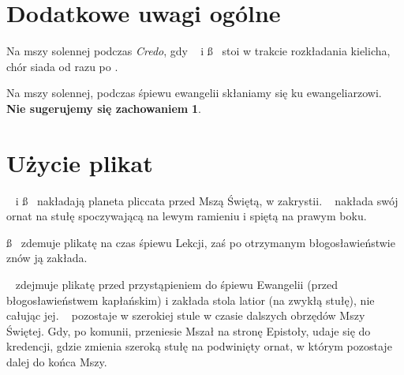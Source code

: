 \section{Dodatkowe uwagi ogólne}

\begin{itemize*}
    \item Na mszy solennej podczas \textit{Credo}, gdy \dd~ i \ss~ stoi w
          trakcie rozkładania kielicha, chór siada od razu po \ii.
    \item Na mszy solennej, podczas śpiewu ewangelii skłaniamy się ku
          ewangeliarzowi. \textbf{Nie sugerujemy się zachowaniem}
          \boldmath{\cc}\textbf{1}.
\end{itemize*}

\section{Użycie plikat}

\begin{itemize*}
    \item \dd~ i \ss~ nakładają planeta pliccata przed Mszą Świętą, w zakrystii.
          \dd~ nakłada swój ornat na stułę spoczywającą na lewym ramieniu i
          spiętą na prawym boku.
    \item \ss~ zdemuje plikatę na czas śpiewu Lekcji, zaś po otrzymanym
          błogosławieństwie znów ją zakłada.
    \item \dd~ zdejmuje plikatę przed przystąpieniem do śpiewu Ewangelii (przed
          błogosławieństwem kapłańskim) i zakłada stola latior (na zwykłą
          stułę), nie całując jej. \dd~ pozostaje w szerokiej stule w czasie
          dalszych obrzędów Mszy Świętej. Gdy, po komunii, przeniesie Mszał na
          stronę Epistoły, udaje się do kredencji, gdzie zmienia szeroką stułę
          na podwinięty ornat, w którym pozostaje dalej do końca Mszy.
\end{itemize*}